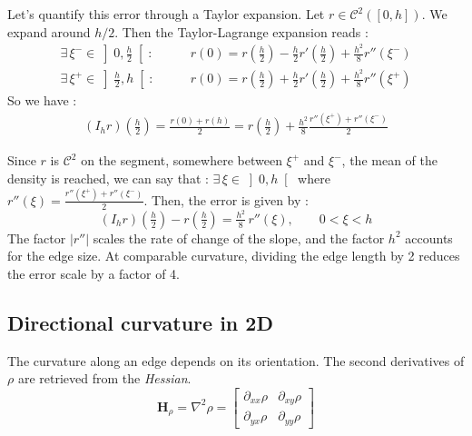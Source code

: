 \documentclass[11pt,a4paper]{article}
\begin{document}
\vspace{3pt}
\noindent
Let's quantify this error through a Taylor expansion. Let $r\in \mathcal{C}^2([0,h])$. We expand around $h/2$. Then the Taylor-Lagrange expansion reads : 
\begin{align}
    \exists \,\xi^- \in \left]0,\tfrac{h}{2}\right[ :\qquad & r(0) = r\left(\tfrac{h}{2}\right) -\tfrac{h}{2}r'\left(\tfrac{h}{2}\right) + \tfrac{h^2}{8} r''\left(\xi^-\right) \\
    \exists \,\xi^+ \in \left]\tfrac{h}{2},h\right[ : \qquad & r(0) = r\left(\tfrac{h}{2}\right) +\tfrac{h}{2}r'\left(\tfrac{h}{2}\right) + \tfrac{h^2}{8} r''\left(\xi^+\right)
\end{align}
\noindent
So we have :
\begin{align}
    \left(I_hr\right)\left(\tfrac{h}{2}\right)  =\frac{r(0)+r(h)} {2} = r\left(\tfrac{h}{2}\right) + \frac{h^2}{8} \frac{r''\left(\xi^+\right)+r''\left(\xi^-\right)}{2}
\end{align}

\noindent
Since \(r\) is $\mathcal{C}^2$ on the segment, somewhere between $\xi^+$ and $\xi^-$, the mean of the density is reached, we can say that : $\exists \,\xi \in \left]0,h\right[$ where $r''(\xi)=\tfrac{r''\left(\xi^+\right)+r''\left(\xi^-\right)}{2}$. Then, the error is given by : 
\begin{equation}
  \boxed{  
  \left(I_hr\right)\left(\tfrac{h}{2}\right)  - r\left(\tfrac{h}{2}\right)=\tfrac{h^2}{8}\,r''(\xi),
  \qquad 0<\xi<h }
\end{equation}
The factor \(\lvert r''\rvert\) scales the rate of change of the
slope, and the factor \(h^2\) accounts for the edge size. At comparable
curvature, dividing the edge length by 2 reduces the error scale by a factor of 4.



\subsection{Directional curvature in 2D}

\noindent
The curvature along an edge depends on its orientation. The second
derivatives of \(\rho\) are retrieved from the
\emph{Hessian}.
\begin{equation}
  \mathbf{H}_\rho=\nabla^2\rho =
  \begin{bmatrix}
    \partial_{xx}\rho & \partial_{xy}\rho\\
    \partial_{yx}\rho & \partial_{yy}\rho
  \end{bmatrix}
\end{equation}
\end{document}
